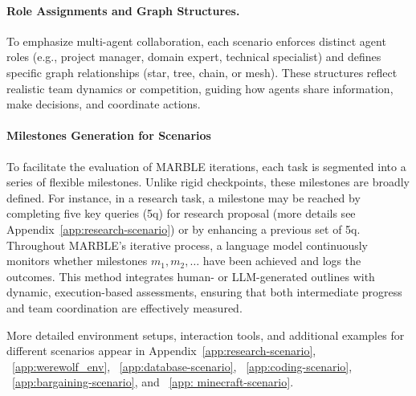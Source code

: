 \paragraph{Role Assignments and Graph Structures.}
To emphasize multi-agent collaboration, each scenario enforces distinct agent roles (e.g., project manager, domain expert, technical specialist) and defines specific graph relationships (star, tree, chain, or mesh). These structures reflect realistic team dynamics or competition, guiding how agents share information, make decisions, and coordinate actions.

\paragraph{Milestones Generation for Scenarios} 
\label{para:milestones}
To facilitate the evaluation of MARBLE iterations, each task is segmented into a series of flexible milestones. Unlike rigid checkpoints, these milestones are broadly defined. For instance, in a research task, a milestone may be reached by completing five key queries (5q) for research proposal (more details see Appendix~\ref{app:research-scenario}) or by enhancing a previous set of 5q. Throughout MARBLE's iterative process, a language model continuously monitors whether milestones \(m_1, m_2, \dots\) have been achieved and logs the outcomes. This method integrates human- or LLM-generated outlines with dynamic, execution-based assessments, ensuring that both intermediate progress and team coordination are effectively measured.


More detailed environment setups, interaction tools, and additional examples for different scenarios appear in Appendix~\ref{app:research-scenario}, ~\ref{app:werewolf_env}, ~\ref{app:database-scenario}, ~\ref{app:coding-scenario}, ~\ref{app:bargaining-scenario}, and ~\ref{app: minecraft-scenario}.


